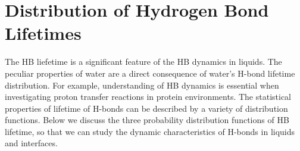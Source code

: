 \section{Distribution of Hydrogen Bond Lifetimes}
The HB liefetime is a significant feature of the HB dynamics in liquids. 
The peculiar properties of water are a direct consequence of water's H-bond lifetime distribution.\cite{Lee2007,Sciortino1989,Sciortino1990prl} 
For example, understanding of HB dynamics is essential when investigating proton transfer reactions in protein environments.\cite{Ishikita2013}  
The statistical properties of lifetime of H-bonds can be described by a variety of distribution functions.{\cite{Rapaport1983, Tanaka1983, Geiger1984,Naberukhin2009}
Below we discuss the three probability distribution functions of HB lifetime, so that we can study the dynamic characteristics of H-bonds in liquids and interfaces.
%
\FloatBarrier
}
